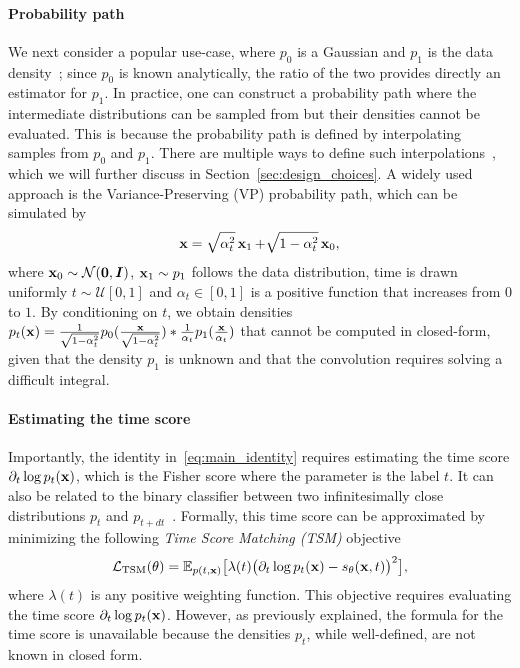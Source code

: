 \paragraph{Probability path}
We next consider a popular use-case, where $p_0$ is a Gaussian and $p_1$ is the data density~\citep{Rhodes2020,choi2022densityratio}; since $p_0$ is known analytically, the ratio of the two provides directly an estimator for $p_1$. 
In practice, one can construct a probability path where the intermediate distributions can  be sampled from but their densities cannot be evaluated. This is because the probability path is defined by interpolating samples from $p_0$ and $p_1$. There are multiple ways to define such interpolations~\citep{Rhodes2020,Albergo2023}, which we will further discuss in Section~\ref{sec:design_choices}. A widely used approach is the Variance-Preserving (VP) probability path, which can be simulated by~\citep{song2021sde,lipman2023conditionalflowmatching,choi2022densityratio}
\begin{align}
\label{eq:vp_path_simulation}
\operatorname{\mathbf{x}} = \sqrt{\alpha_{t}^2} \operatorname{\mathbf{x}}_{1} + \sqrt{1 - \alpha_{t}^{2}}\operatorname{\mathbf{x}}_{0},
\end{align}
where $\operatorname{\mathbf{x}}_0 \sim \mathcal{N}(\operatorname{\mathbf{0}}, {\bm{I}})$, $\operatorname{\mathbf{x}}_1 \sim p_1$ follows the data distribution, time is drawn uniformly $t \sim \mathcal{U}[0, 1]$ and $\alpha_t \in [0, 1]$ is a positive function that increases from $0$ to $1$. By conditioning on $t$, we obtain densities $p_t(\operatorname{\mathbf{x}}) = \frac{1}{\sqrt{1 - \alpha_{t}^{2}}} p_0(\frac{\operatorname{\mathbf{x}}}{\sqrt{1 - \alpha_{t}^{2}}}) \ast \frac{1}{\alpha_{t}} p_1(\frac{\operatorname{\mathbf{x}}}{\alpha_{t}})$ that cannot be computed in closed-form, given that the density $p_1$ is unknown and that the convolution requires solving a difficult integral. 
 
\paragraph{Estimating the time score}
Importantly, the identity in~\eqref{eq:main_identity} requires estimating the time score $\partial_t \log p_t(\operatorname{\mathbf{x}})$, which is the Fisher score where the parameter is the label $t$. It can also be related to the binary classifier between two infinitesimally close distributions $p_t$ and $p_{t + dt}$~\citep[Proposition 3]{choi2022densityratio}. Formally, this time score can be approximated by minimizing the following \textit{Time Score Matching (TSM)} objective
\begin{align}
    \label{eq:l2_loss}
    \mathcal{L}_{\text{TSM}}(\operatorname{\mathbf{\theta}}) 
    = 
    \mathbb{E}_{p(t, \operatorname{\mathbf{x}})} \big[
    \lambda(t)
    \big( \partial_{t}\log p_{t}(\operatorname{\mathbf{x}}) 
    - 
    s_{\operatorname{\mathbf{\theta}}}(\operatorname{\mathbf{x}}, t) \big)^2
    \big],
\end{align}
where $\lambda(t)$ is any positive weighting function. This objective requires evaluating the time score $\partial_t \log p_t(\operatorname{\mathbf{x}})$. However, as previously explained, the formula for the time score is unavailable because the densities $p_t$, while well-defined, are not known in closed form.

